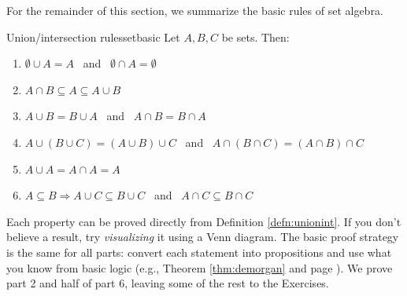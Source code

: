 For the remainder of this section, we summarize the basic rules of set algebra.

\begin{thm}{Union/intersection rules}{setbasic}
	Let $A,B,C$ be sets. Then:
	\begin{enumerate}\itemsep2pt
		\item $\emptyset\cup A=A$ \ and \ $\emptyset\cap A=\emptyset$
		\item $A\cap B\subseteq A\subseteq A\cup B$
		\item $A\cup B=B\cup A$ \ and \ $A\cap B=B\cap A$
		\item $A\cup (B\cup C)=(A\cup B)\cup C$ \ and \ $A\cap (B\cap C)=(A\cap B)\cap C$
		\item $A\cup A=A\cap A=A$
		\item $A\subseteq B\Longrightarrow A\cup C\subseteq B\cup C$ \ and \ $A\cap C\subseteq B\cap C$
	\end{enumerate}
\end{thm}

Each property can be proved directly from Definition \ref{defn:unionint}. If you don't believe a result, try \emph{visualizing} it using a Venn diagram. The basic proof strategy is the same for all parts: convert each statement into propositions and use what you know from basic logic (e.g., Theorem \ref{thm:demorgan} and page \pageref{pg:asidelogicalgebra}). We prove part 2 and half of part 6, leaving some of the rest to the Exercises.

